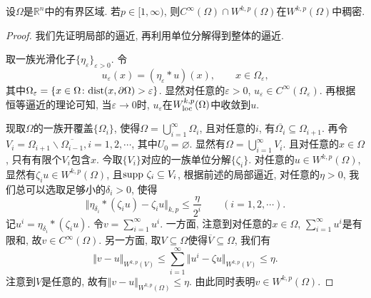 \begin{theorem}
    设$\Omega$是$\mathbb{R}^n$中的有界区域. 若$p \in [1, \infty)$, 则$C^{\infty}(\Omega) \cap W^{k, p}(\Omega)$在$W^{k, p}(\Omega)$中稠密.
    \begin{proof}
        我们先证明局部的逼近, 再利用单位分解得到整体的逼近.

        取一族光滑化子$\{\eta_{\varepsilon}\}_{\varepsilon > 0}$. 令
        \begin{equation*}
            u_{\varepsilon}(x) = (\eta_{\varepsilon} \ast u)(x), \qquad x \in \Omega_{\varepsilon},
        \end{equation*}
        其中$\Omega_{\varepsilon} = \{x \in \Omega\colon {\rm dist}(x, \partial\Omega) > \varepsilon\}$.
        显然对任意的$\varepsilon > 0$, $u_{\varepsilon} \in C^{\infty}(\Omega_{\varepsilon})$. 再根据恒等逼近的理论可知, 当$\varepsilon \rightarrow 0$时, $u_{\varepsilon}$在$W_{{\rm loc}}^{k, p}(\Omega)$中收敛到$u$.

        现取$\Omega$的一族开覆盖$\{\Omega_i\}$, 使得$\Omega = \bigcup_{i = 1}^{\infty}\Omega_i$, 且对任意的$i$, 有$\overline{\Omega_i} \subseteq \Omega_{i + 1}$.
        再令$V_i = \Omega_{i + 1} \smallsetminus \overline{\Omega_{i - 1}}, i = 1, 2, \cdots$, 其中$U_0 = \varnothing$.
        显然有$\Omega = \bigcup_{i = 1}^{\infty}V_i$. 且对任意的$x \in \Omega$, 只有有限个$V_i$包含$x$.
        今取$\{V_i\}$对应的一族单位分解$\{\zeta_i\}$. 对任意的$u \in W^{k, p}(\Omega)$, 显然有$\zeta_iu \in W^{k, p}(\Omega)$, 且${\rm supp}\ \zeta_i \subseteq V_i$, 根据前述的局部逼近, 对任意的$\eta > 0$, 我们总可以选取足够小的$\delta_i > 0$, 使得 
        \begin{equation*}
            \Vert \eta_{\delta_i} \ast (\zeta_iu) - \zeta_iu\Vert_{k, p} \leq \frac{\eta}{2^i} \qquad (i = 1, 2, \cdots).
        \end{equation*}
        记$u^i = \eta_{\delta_i} \ast (\zeta_iu)$. 令$v = \sum_{i = 1}^{\infty}u^i$.
        一方面, 注意到对任意的$x \in \Omega$, $\sum_{i = 1}^{\infty}u^i$是有限和, 故$v \in C^{\infty}(\Omega)$.
        另一方面, 取$V \subseteq \Omega$使得$\overline{V} \subseteq \Omega$, 我们有
        \begin{equation*}
            \Vert v - u \Vert_{W^{k, p}(V)} \leq \sum_{i = 1}^{\infty}\Vert u^i - \zeta u\Vert_{W^{k, p}(V)} \leq \eta.
        \end{equation*}
        注意到$V$是任意的, 故有$\Vert v - u \Vert_{W^{k, p}(\Omega)} \leq \eta$. 由此同时表明$v \in W^{k, p}(\Omega)$.
    \end{proof}
\end{theorem}


